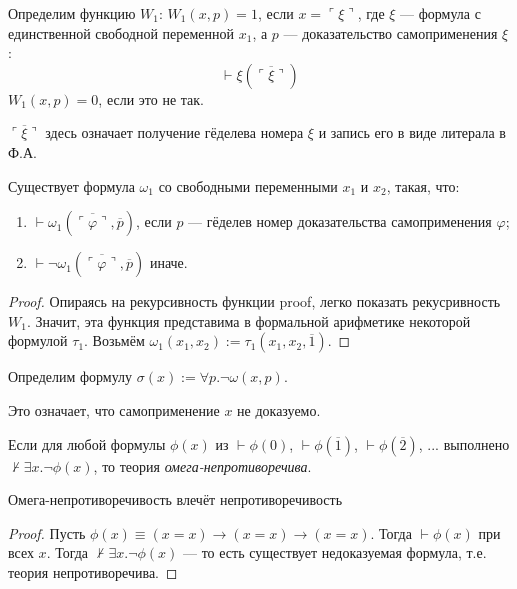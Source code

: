 \begin{definition}
    Определим функцию $W_1$:
$W_1(x,p)=1$, если
$x = \ulcorner \xi \urcorner$, где $\xi$ --- формула с единственной свободной переменной $x_1$, а $p$ --- доказательство самоприменения $\xi$:
$$\vdash \xi(\overline{\ulcorner \xi \urcorner})$$
$W_1(x,p)=0$, если это не так.
\end{definition}

\begin{note}
    $\overline{\ulcorner \xi \urcorner}$ здесь означает получение гёделева номера $\xi$ и запись его в виде литерала в Ф.А.
\end{note}

\begin{theorem}
    Существует формула $\omega_1$ со свободными переменными $x_1$ и $x_2$,
такая, что:
\begin{enumerate}
\item $\vdash \omega_1(\overline{\ulcorner \varphi \urcorner},\overline{p})$, если $p$ --- гёделев номер
доказательства самоприменения $\varphi$;
\item $\vdash \neg\omega_1(\overline{\ulcorner \varphi \urcorner},\overline{p})$ иначе.
\end{enumerate}
\end{theorem}

\begin{proof}
    Опираясь на рекурсивность функции proof, легко показать рекусривность $W_1$.
Значит, эта функция представима в формальной арифметике некоторой формулой $\tau_1$.
Возьмём $\omega_1(x_1,x_2) := \tau_1(x_1,x_2,\overline{1})$.
\end{proof}

\begin{definition}
    Определим формулу $\sigma(x) := \forall p.\neg\omega(x,p)$.

    Это означает, что самоприменение $x$ не доказуемо.
\end{definition}


\begin{definition}
    Если для любой формулы $\phi(x)$ из $\vdash\phi(0)$, $\vdash\phi(\overline{1})$,
$\vdash\phi(\overline{2})$, ... выполнено $\not\vdash\exists x.\neg\phi(x)$,
то теория \emph{омега-непротиворечива}.
\end{definition}
\begin{theorem}
    Омега-непротиворечивость влечёт непротиворечивость
\end{theorem}
\begin{proof}
    Пусть $\phi(x) \equiv (x=x)\rightarrow(x=x)\rightarrow(x=x)$. Тогда $\vdash\phi(x)$ при всех $x$.
Тогда $\not\vdash\exists x.\neg\phi(x)$ --- то есть существует недоказуемая формула, т.е. теория непротиворечива.
\end{proof}
